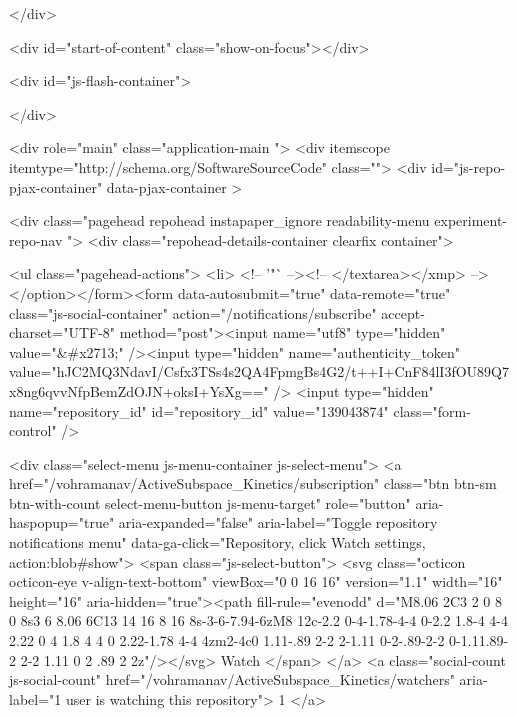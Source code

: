       

  </div>

  <div id="start-of-content" class="show-on-focus"></div>

    <div id="js-flash-container">


</div>



  <div role="main" class="application-main ">
        <div itemscope itemtype="http://schema.org/SoftwareSourceCode" class="">
    <div id="js-repo-pjax-container" data-pjax-container >
      







  <div class="pagehead repohead instapaper_ignore readability-menu experiment-repo-nav  ">
    <div class="repohead-details-container clearfix container">

      <ul class="pagehead-actions">
  <li>
        <!-- '"` --><!-- </textarea></xmp> --></option></form><form data-autosubmit="true" data-remote="true" class="js-social-container" action="/notifications/subscribe" accept-charset="UTF-8" method="post"><input name="utf8" type="hidden" value="&#x2713;" /><input type="hidden" name="authenticity_token" value="hJC2MQ3NdavI/Csfx3TSs4s2QA4FpmgBs4G2/t++I+CnF84lI3fOU89Q7x8ng6qvvNfpBemZdOJN+oksI+YsXg==" />      <input type="hidden" name="repository_id" id="repository_id" value="139043874" class="form-control" />

        <div class="select-menu js-menu-container js-select-menu">
          <a href="/vohramanav/ActiveSubspace_Kinetics/subscription"
            class="btn btn-sm btn-with-count select-menu-button js-menu-target"
            role="button"
            aria-haspopup="true"
            aria-expanded="false"
            aria-label="Toggle repository notifications menu"
            data-ga-click="Repository, click Watch settings, action:blob#show">
            <span class="js-select-button">
                <svg class="octicon octicon-eye v-align-text-bottom" viewBox="0 0 16 16" version="1.1" width="16" height="16" aria-hidden="true"><path fill-rule="evenodd" d="M8.06 2C3 2 0 8 0 8s3 6 8.06 6C13 14 16 8 16 8s-3-6-7.94-6zM8 12c-2.2 0-4-1.78-4-4 0-2.2 1.8-4 4-4 2.22 0 4 1.8 4 4 0 2.22-1.78 4-4 4zm2-4c0 1.11-.89 2-2 2-1.11 0-2-.89-2-2 0-1.11.89-2 2-2 1.11 0 2 .89 2 2z"/></svg>
                Watch
            </span>
          </a>
          <a class="social-count js-social-count"
            href="/vohramanav/ActiveSubspace_Kinetics/watchers"
            aria-label="1 user is watching this repository">
            1
          </a>

